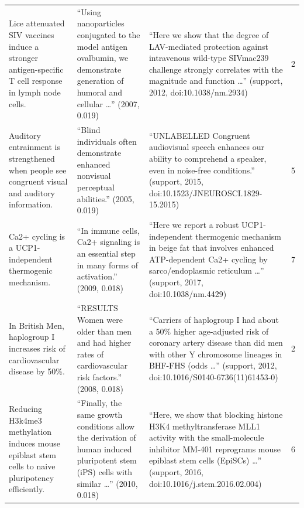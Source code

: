 \begin{tabular}{>{\raggedright\arraybackslash}p{3.0cm}>{\raggedright\arraybackslash}p{4.7cm}>{\raggedright\arraybackslash}p{6.6cm}c}
Lice attenuated SIV vaccines induce a stronger antigen-specific T cell response in lymph node cells. & ``Using nanoparticles conjugated to the model antigen ovalbumin, we demonstrate generation of humoral and cellular \ldots{}'' (2007, 0.019) & ``Here we show that the degree of LAV-mediated protection against intravenous wild-type SIVmac239 challenge strongly correlates with the magnitude and function \ldots{}'' (support, 2012, doi:10.1038/nm.2934) & 2 \\
Auditory entrainment is strengthened when people see congruent visual and auditory information. & ``Blind individuals often demonstrate enhanced nonvisual perceptual abilities.'' (2005, 0.019) & ``UNLABELLED Congruent audiovisual speech enhances our ability to comprehend a speaker, even in noise-free conditions.'' (support, 2015, doi:10.1523/JNEUROSCI.1829-15.2015) & 5 \\
Ca2+ cycling is a UCP1-independent thermogenic mechanism. & ``In immune cells, Ca2+ signaling is an essential step in many forms of activation.'' (2009, 0.018) & ``Here we report a robust UCP1-independent thermogenic mechanism in beige fat that involves enhanced ATP-dependent Ca2+ cycling by sarco/endoplasmic reticulum \ldots{}'' (support, 2017, doi:10.1038/nm.4429) & 7 \\
In British Men, haplogroup I increases risk of cardiovascular disease by 50\%. & ``RESULTS Women were older than men and had higher rates of cardiovascular risk factors.'' (2008, 0.018) & ``Carriers of haplogroup I had about a 50\% higher age-adjusted risk of coronary artery disease than did men with other Y chromosome lineages in BHF-FHS (odds \ldots{}'' (support, 2012, doi:10.1016/S0140-6736(11)61453-0) & 2 \\
Reducing H3k4me3 methylation induces mouse epiblast stem cells to naive pluripotency efficiently. & ``Finally, the same growth conditions allow the derivation of human induced pluripotent stem (iPS) cells with similar \ldots{}'' (2010, 0.018) & ``Here, we show that blocking histone H3K4 methyltransferase MLL1 activity with the small-molecule inhibitor MM-401 reprograms mouse epiblast stem cells (EpiSCs) \ldots{}'' (support, 2016, doi:10.1016/j.stem.2016.02.004) & 6 \\
\bottomrule
\end{tabular}
